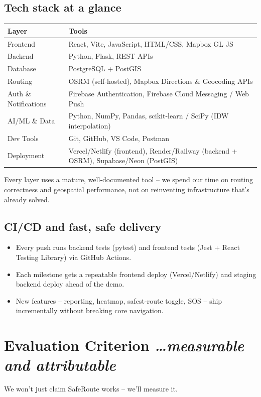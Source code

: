\documentclass[11pt,a4paper]{article}
\newcommand{\BvrHint}[1]{%
  {\normalfont\normalsize\itshape\hfill #1}}
\begin{document}
\subsection{Tech stack at a glance}
\begin{center}
\begin{tabular}{@{}p{3.2cm}p{10cm}@{}}
\toprule
\textbf{Layer} & \textbf{Tools} \\
\midrule
Frontend & React, Vite, JavaScript, HTML/CSS, Mapbox GL JS \\
Backend & Python, Flask, REST APIs \\
Database & PostgreSQL + PostGIS \\
Routing & OSRM (self-hosted), Mapbox Directions \& Geocoding APIs \\
Auth \& Notifications & Firebase Authentication, Firebase Cloud Messaging / Web Push \\
AI/ML \& Data & Python, NumPy, Pandas, scikit-learn / SciPy (IDW interpolation) \\
Dev Tools & Git, GitHub, VS Code, Postman \\
Deployment & Vercel/Netlify (frontend), Render/Railway (backend + OSRM), Supabase/Neon (PostGIS) \\
\bottomrule
\end{tabular}
\end{center}
Every layer uses a mature, well-documented tool -- we spend our
time on routing correctness and geospatial performance, not on
reinventing infrastructure that's already solved.

\subsection{CI/CD and fast, safe delivery}
\begin{itemize}[leftmargin=0.7cm]
    \item Every push runs backend tests (pytest) and frontend
    tests (Jest + React Testing Library) via GitHub Actions.
    \item Each milestone gets a repeatable frontend deploy
    (Vercel/Netlify) and staging backend deploy ahead of the demo.
    \item New features -- reporting, heatmap, safest-route toggle,
    SOS -- ship incrementally without breaking core navigation.
\end{itemize}

\section{Evaluation Criterion %
\BvrHint{\ldots measurable and attributable}}
We won't just claim SafeRoute works -- we'll measure it.
\end{document}
